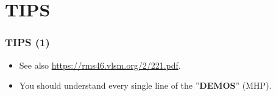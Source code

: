 
\section{TIPS}

\begin{frame}[fragile]
\frametitle{TIPS (1)}

\begin{itemize}

\item See also \url{https://rms46.vlsm.org/2/221.pdf}.

\item You should understand every single line of the ''\textbf{DEMOS}'' (MHP).

\end{itemize}

\end{frame}

